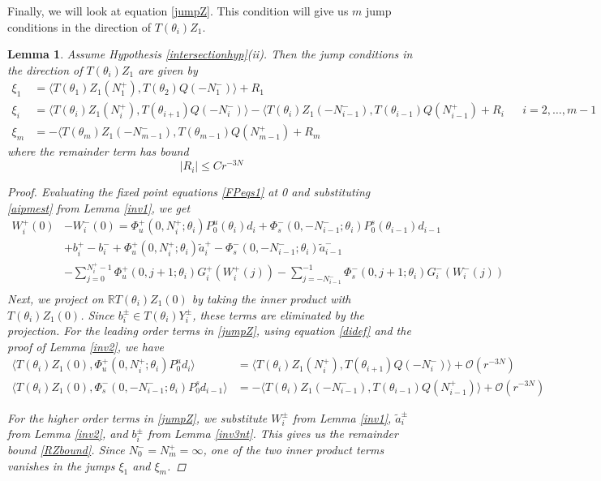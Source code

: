 \documentclass[12pt]{article}
\def\R{{\mathbb R}}
\newtheorem{lemma}{Lemma}
\begin{document}
Finally, we will look at equation \ref{jumpZ}. This condition will give us $m$ jump conditions in the direction of $T(\theta_i) Z_1$.

\begin{lemma}\label{jumpZlemma}
Assume Hypothesis \ref{intersectionhyp}(ii). Then the jump conditions in the direction of $T(\theta_i) Z_1$ are given by
\begin{equation}\label{jumpZ}
\begin{aligned}
\xi_1 &= \langle T(\theta_1) Z_1(N_1^+), T(\theta_2) Q(-N_1^-) \rangle + R_1  \\
\xi_i &= \langle T(\theta_i) Z_1(N_i^+), T(\theta_{i+1}) Q(-N_i^-) \rangle
- \langle T(\theta_i) Z_1(-N_{i-1}^-), T(\theta_{i-1}) Q(N_{i-1}^+) + R_i &&
i = 2, \dots, m-1 \\
\xi_m &= -\langle T(\theta_m) Z_1(-N_{m-1}^-), T(\theta_{m-1}) Q(N_{m-1}^+) + R_m
\end{aligned}
\end{equation}
where the remainder term has bound
\begin{equation}\label{RZbound}
|R_i| \leq C r^{-3N}
\end{equation}
\begin{proof}
Evaluating the fixed point equations \eqref{FPeqs1} at 0 and substituting \eqref{aipmest} from Lemma \ref{inv1}, we get
\begin{align*}
W_i^+(0) &- W_i^-(0) = \Phi_u^+(0, N_i^+; \theta_i) P_0^u(\theta_i) d_i + \Phi_s^-(0, -N_{i-1}^-; \theta_i) P_0^s(\theta_{i-1}) d_{i-1} \\
&+ b_i^+ - b_i^- 
+ \Phi_u^+(0, N_i^+; \theta_i) \tilde{a}_i^+ - \Phi_s^-(0, -N_{i-1}^-; \theta_i) \tilde{a}_{i-1}^- \\
&- \sum_{j = 0}^{N_i^+-1} \Phi_u^+(0, j+1; \theta_i) G_i^+(W_i^+(j)) 
- \sum_{j = -N_{i-1}^-}^{-1} \Phi_s^-(0, j+1; \theta_i) G_i^-(W_i^-(j)) \\
\end{align*}
Next, we project on $\R T(\theta_i) Z_1(0)$ by taking the inner product with $T(\theta_i) Z_1(0)$. Since $b_i^\pm \in T(\theta_i) Y_i^\pm$, these terms are eliminated by the projection. For the leading order terms in \eqref{jumpZ}, using equation \eqref{didef} and the proof of Lemma \ref{inv2}, we have
\begin{align*}
\langle T(\theta_i) Z_1(0), \Phi_u^+(0, N_i^+; \theta_i) P_0^u d_i \rangle
&= \langle T(\theta_i) Z_1(N_i^+), T(\theta_{i+1}) Q(-N_i^-) \rangle + \mathcal{O}(r^{-3N}) \\
\langle T(\theta_i) Z_1(0), \Phi_s^-(0, -N_{i-1}^-; \theta_i) P_0^s d_{i-1} \rangle
&= -\langle T(\theta_i) Z_1(-N_{i-1}^-), T(\theta_{i-1}) Q(N_{i-1}^+) \rangle + \mathcal{O}(r^{-3N})
\end{align*}

For the higher order terms in \eqref{jumpZ}, we substitute $W_i^\pm$ from Lemma \ref{inv1}, $\tilde{a}_i^\pm$ from Lemma \ref{inv2}, and $b_i^\pm$ from Lemma \ref{inv3nt}. This gives us the remainder bound \eqref{RZbound}. Since $N_0^- = N_m^+ = \infty$, one of the two inner product terms vanishes in the jumps $\xi_1$ and $\xi_m$. 
\end{proof}
\end{lemma}
\end{document}
